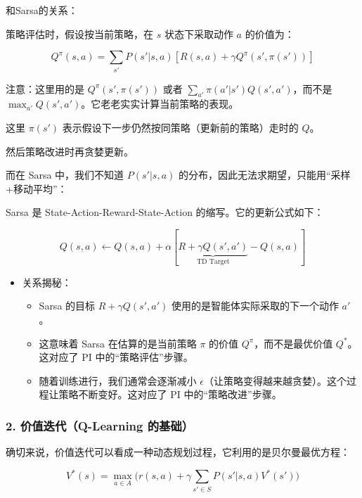 和Sarsa的关系：

策略评估时，假设按当前策略，在 \(s\) 状态下采取动作 \(a\) 的价值为：

\[
Q^{\pi}(s,a)=\sum_{s'}P(s'|s,a)[R(s,a)+\gamma Q^{\pi}(s',\pi(s'))]
\]

注意：这里用的是 \(Q^{\pi}(s',\pi(s'))\) 或者 \(\sum_{a'}\pi(a'|s')Q(s',a')\)，而不是 \(\max_{a'}Q(s',a')\)。它老老实实计算当前策略的表现。

这里 \(\pi(s')\) 表示假设下一步仍然按同策略（更新前的策略）走时的 \(Q\)。

然后策略改进时再贪婪更新。

而在 Sarsa 中，我们不知道 \(P(s'|s,a)\) 的分布，因此无法求期望，只能用``采样+移动平均''：

Sarsa 是 State-Action-Reward-State-Action 的缩写。它的更新公式如下：

\[
Q(s,a)\leftarrow Q(s,a)+\alpha[\underbrace{R+\gamma Q(s',a')}_{\text{TD Target}}-Q(s,a)]
\]

\begin{itemize}
\tightlist
\item
{}
  关系揭秘：

  \begin{itemize}
  \tightlist
  \item
    Sarsa 的目标 \(R+\gamma Q(s',a')\) 使用的是智能体实际采取的下一个动作 \(a'\)。
  \item
    这意味着 Sarsa 在估算的是当前策略 \(\pi\) 的价值 \(Q^{\pi}\)，而不是最优价值 \(Q^{*}\)。这对应了 PI 中的``策略评估''步骤。
  \item
    随着训练进行，我们通常会逐渐减小 \(\epsilon\)（让策略变得越来越贪婪）。这个过程让策略不断变好。这对应了 PI 中的``策略改进''步骤。
  \end{itemize}
\end{itemize}

\hypertarget{ux4ef7ux503cux8fedux4ee3q-learning-ux7684ux57faux7840}{%
\subsubsection{2. 价值迭代（Q-Learning 的基础）}\label{ux4ef7ux503cux8fedux4ee3q-learning-ux7684ux57faux7840}}

确切来说，价值迭代可以看成一种动态规划过程，它利用的是贝尔曼最优方程：

\[
V^{*}(s)=\max_{a\in A}\bigl(r(s,a)+\gamma\sum_{s'\in S}P(s'|s,a)V^{*}(s')\bigr)
\]

